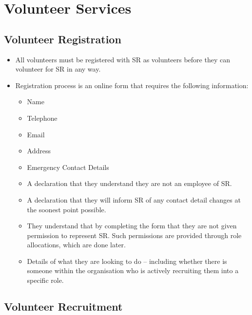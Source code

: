 \chapter{Volunteer Services}

\section{Volunteer Registration}

\begin{itemize}
\item All volunteers must be registered with SR as volunteers before they can volunteer for SR in any way.
\item Registration process is an online form that requires the following information:
  \begin{itemize}
  \item Name
  \item Telephone
  \item Email
  \item Address
  \item Emergency Contact Details
  \item A declaration that they understand they are not an employee of SR.
  \item A declaration that they will inform SR of any contact detail changes at the soonest point possible.
  \item They understand that by completing the form that they are not given permission to represent SR.  Such permissions are provided through role allocations, which are done later.
  \item Details of what they are looking to do -- including whether there is someone within the organisation who is actively recruiting them into a specific role.
  \end{itemize}
\end{itemize}

\section{Volunteer Recruitment}

